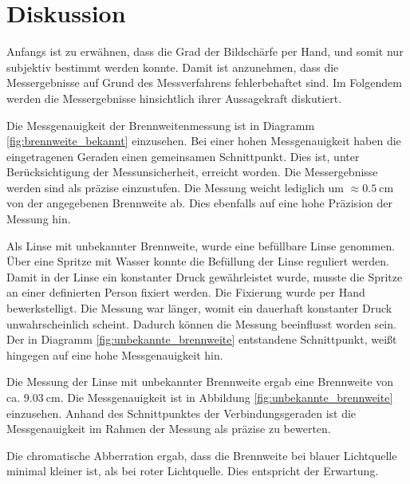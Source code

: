 \section{Diskussion}

Anfangs ist zu erwähnen, dass die Grad der Bildschärfe per Hand, und somit
nur subjektiv bestimmt werden konnte. Damit ist anzunehmen, dass die Messergebnisse
auf Grund des Messverfahrens fehlerbehaftet sind.
Im Folgendem werden die Messergebnisse hinsichtlich ihrer Aussagekraft diskutiert.

Die Messgenauigkeit der Brennweitenmessung ist in Diagramm
\ref{fig:brennweite_bekannt} einzusehen. Bei einer hohen Messgenauigkeit haben
die eingetragenen Geraden einen gemeinsamen Schnittpunkt. Dies ist, unter
Berücksichtigung der Messunsicherheit, erreicht worden. Die Messergebnisse
werden sind als präzise einzustufen. Die Messung weicht lediglich um
$\approx\SI{0,5}{\centi\meter}$ von der angegebenen Brennweite ab. Dies ebenfalls
auf eine hohe Präzision der Messung hin.

Als Linse mit unbekannter Brennweite, wurde eine befüllbare Linse genommen. Über eine
Spritze mit Wasser konnte die Befüllung der Linse reguliert werden.
Damit in der Linse ein konstanter Druck gewährleistet wurde, musste die Spritze an
einer definierten Person fixiert werden.
Die Fixierung wurde per Hand bewerkstelligt. Die Messung war länger, womit
ein dauerhaft konstanter Druck unwahrscheinlich scheint. Dadurch können
die Messung beeinflusst worden sein. Der in Diagramm
\ref{fig:unbekannte_brennweite} entstandene Schnittpunkt, weißt hingegen auf eine
hohe Messgenauigkeit hin.

Die Messung der Linse mit unbekannter Brennweite ergab eine Brennweite von ca. $\SI{9,03}{\centi\meter}$.
Die Messgenauigkeit ist in Abbildung \ref{fig:unbekannte_brennweite} einzusehen.
Anhand des Schnittpunktes der Verbindungsgeraden ist die Messgenauigkeit im Rahmen
der Messung als präzise zu bewerten.

Die chromatische Abberration ergab, dass die Brennweite bei blauer Lichtquelle
minimal kleiner ist, als bei roter Lichtquelle. Dies entspricht der Erwartung.
